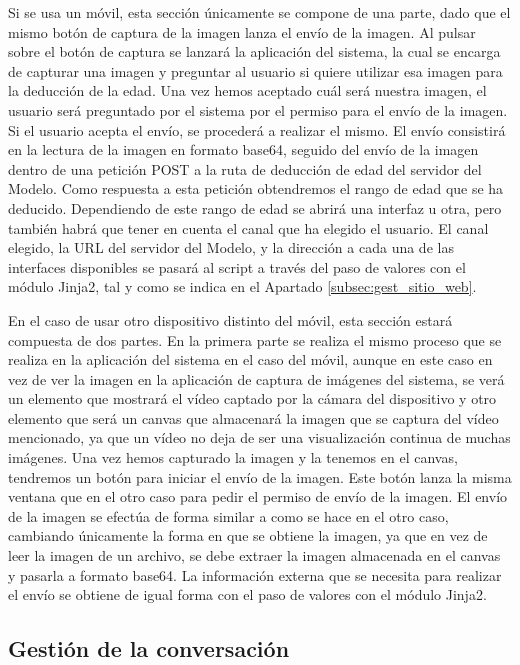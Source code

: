 Si se usa un móvil, esta sección únicamente se compone de una parte, dado que el mismo botón de captura de la imagen lanza el envío de la imagen. Al pulsar sobre el botón de captura se lanzará la aplicación del sistema, la cual se encarga de capturar una imagen y preguntar al usuario si quiere utilizar esa imagen para la deducción de la edad. Una vez hemos aceptado cuál será nuestra imagen, el usuario será preguntado por el sistema por el permiso para el envío de la imagen. Si el usuario acepta el envío, se procederá a realizar el mismo. El envío consistirá en la lectura de la imagen en formato base64, seguido del envío de la imagen dentro de una petición POST a la ruta de deducción de edad del servidor del Modelo. Como respuesta a esta petición obtendremos el rango de edad que se ha deducido. Dependiendo de este rango de edad se abrirá una interfaz u otra, pero también habrá que tener en cuenta el canal que ha elegido el usuario. El canal elegido, la URL del servidor del Modelo, y la dirección a cada una de las interfaces disponibles se pasará al script a través del paso de valores con el módulo Jinja2, tal y como se indica en el Apartado \ref{subsec:gest_sitio_web}.

En el caso de usar otro dispositivo distinto del móvil, esta sección estará compuesta de dos partes. En la primera parte se realiza el mismo proceso que se realiza en la aplicación del sistema en el caso del móvil, aunque en este caso en vez de ver la imagen en la aplicación de captura de imágenes del sistema, se verá un elemento que mostrará el vídeo captado por la cámara del dispositivo y otro elemento que será un \gls{canvas} que almacenará la imagen que se captura del vídeo mencionado, ya que un vídeo no deja de ser una visualización continua de muchas imágenes. Una vez hemos capturado la imagen y la tenemos en el \gls{canvas}, tendremos un botón para iniciar el envío de la imagen. Este botón lanza la misma ventana que en el otro caso para pedir el permiso de envío de la imagen. El envío de la imagen se efectúa de forma similar a como se hace en el otro caso, cambiando únicamente la forma en que se obtiene la imagen, ya que en vez de leer la imagen de un archivo, se debe extraer la imagen almacenada en el \gls{canvas} y pasarla a formato base64. La información externa que se necesita para realizar el envío se obtiene de igual forma con el paso de valores con el módulo Jinja2.

\subsection{Gestión de la conversación}

